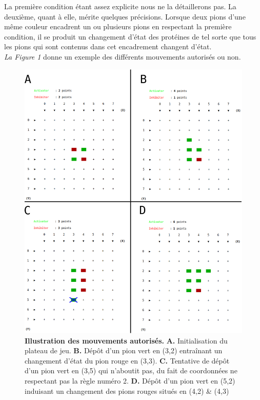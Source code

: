 La première condition étant assez explicite nous ne la détaillerons pas. La deuxième, quant à elle, mérite quelques précisions. Lorsque deux pions d'une même couleur encadrent un ou plusieurs pions en respectant la première condition, il se produit un changement d'état des protéines de tel sorte que tous les pions qui sont contenus dans cet encadrement changent d'état.
\\\emph{La Figure 1} donne un exemple des différents mouvements autorisés ou non.
\\


\begin{figure}
	\begin{center}
	\includegraphics[scale=0.52]{fig1.eps}
	\end{center}
	\caption{\small{\textbf{Illustration des mouvements autorisés.} \textbf{A.} Initialisation du plateau de jeu. \textbf{B.} Dépôt d'un pion vert en (3,2) entraînant un changement d'état du pion rouge en (3,3). \textbf{C.} Tentative de dépôt d'un pion vert en (3,5) qui n'aboutit pas, du fait de coordonnées ne respectant pas la règle numéro 2. \textbf{D. } Dépôt d'un pion vert en (5,2) induisant un changement des pions rouges situés en (4,2) \& (4,3)}}
\end{figure}


